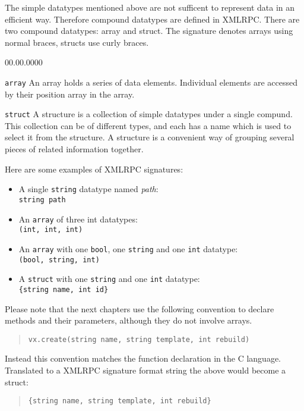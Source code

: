 The simple datatypes mentioned above are not sufficent to represent data in an
efficient way. Therefore compound datatypes are defined in XMLRPC. There are two
compound datatypes: array and struct.  The signature denotes arrays using
normal braces, structs use curly braces.

\begin{labeling}{00.00.0000}
\item [{\texttt{array}}] An array holds a series of data elements. Individual
	elements are accessed by their position array in the array.
\item [{\texttt{struct}}] A structure is a collection of simple datatypes under
	a single compund. This collection can be of different types, and each has
	a name which is used to select it from the structure. A structure is a
	convenient way of grouping several pieces of related information together.
\end{labeling}

Here are some examples of XMLRPC signatures:

\begin{itemize}
\item A single \texttt{string} datatype named \emph{path}:\\
	\texttt{string path}
\item An \texttt{array} of three int datatypes:\\
	\texttt{(int, int, int)}
\item An \texttt{array} with one \texttt{bool}, one \texttt{string} and one
	\texttt{int} datatype:\\
	\texttt{(bool, string, int)}
\item A \texttt{struct} with one \texttt{string} and one \texttt{int}
	datatype:\\
	\texttt{\{string name, int id\}}
\end{itemize}

Please note that the next chapters use the following convention to declare
methods and their parameters, although they do not involve arrays.

\begin{quote}
\texttt{vx.create(string name, string template, int rebuild)}
\end{quote}

Instead this convention matches the function declaration in the C language.
Translated to a XMLRPC signature format string the above would become a struct:

\begin{quote}
\texttt{\{string name, string template, int rebuild\}}
\end{quote}


